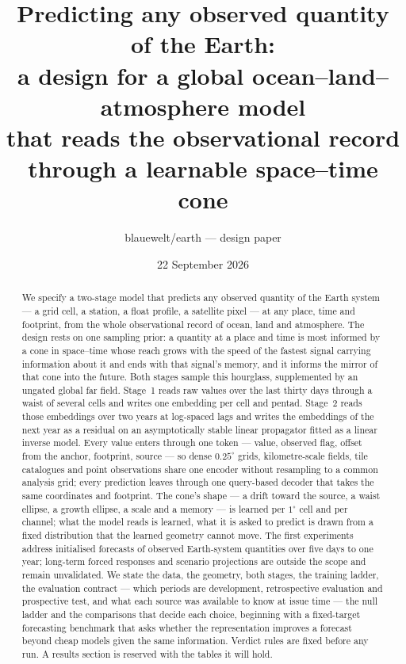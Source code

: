\documentclass[10pt]{article}
\title{Predicting any observed quantity of the Earth:\\
\large a design for a global ocean--land--atmosphere model\\
that reads the observational record through a learnable space--time cone}
\author{blauewelt/earth --- design paper}
\date{22 September 2026}
\begin{document}
\maketitle

\begin{abstract}
We specify a two-stage model that predicts any observed quantity of the Earth
system --- a grid cell, a station, a float profile, a satellite pixel --- at
any place, time and footprint, from the whole observational record of ocean,
land and atmosphere. The design rests on one sampling prior: a quantity at a
place and time is most informed by a cone in space--time whose reach grows
with the speed of the fastest signal carrying information about it and ends
with that signal's memory, and it informs the mirror of that cone into the
future. Both stages sample this hourglass, supplemented by an ungated global
far field. Stage~1 reads raw values over the last thirty days through a waist
of several cells and writes one embedding per cell and pentad. Stage~2 reads
those embeddings over two years at log-spaced lags and writes the embeddings
of the next year as a residual on an asymptotically stable linear propagator
fitted as a linear inverse model. Every value enters through one token ---
value, observed flag, offset from the anchor, footprint, source --- so dense
$0.25^\circ$ grids, kilometre-scale fields, tile catalogues and point
observations share one encoder without resampling to a common analysis grid;
every prediction leaves through one query-based decoder that takes the same
coordinates and footprint. The cone's shape --- a drift toward the source, a
waist ellipse, a growth ellipse, a scale and a memory --- is learned per
$1^\circ$ cell and per channel; what the model reads is learned, what it is
asked to predict is drawn from a fixed distribution that the learned geometry
cannot move. The first experiments address initialised forecasts of observed
Earth-system quantities over five days to one year; long-term forced responses
and scenario projections are outside the scope and remain unvalidated. We
state the data, the geometry, both stages, the training ladder, the evaluation
contract --- which periods are development, retrospective evaluation and
prospective test, and what each source was available to know at issue time
--- the null ladder and the comparisons that decide each choice, beginning
with a fixed-target forecasting benchmark that asks whether the
representation improves a forecast beyond cheap models given the same
information. Verdict rules are fixed before any run. A results section is
reserved with the tables it will hold.
\end{abstract}
\end{document}
